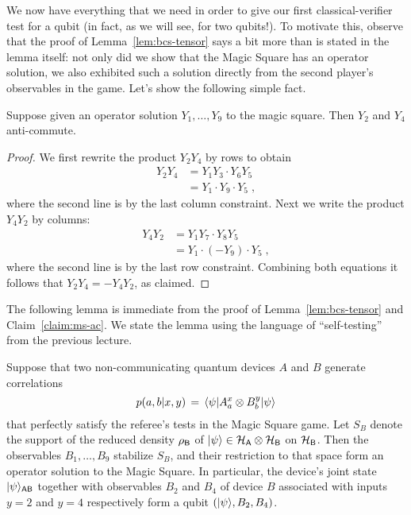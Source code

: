We now have everything that we need in order to give our first classical-verifier test for a qubit (in fact, as we will see, for two qubits!). To motivate this, observe that the proof of Lemma~\ref{lem:bcs-tensor} says a bit more than is stated in the lemma itself: not only did we show that the Magic Square has an operator solution, we also exhibited such a solution directly from the second player's observables in the game. Let's show the following simple fact. 

\begin{claim}\label{claim:ms-ac}
Suppose given an operator solution $Y_1,\ldots,Y_9$ to the magic square. Then $Y_2$ and $Y_4$ anti-commute. 
\end{claim}

\begin{proof}
We first rewrite the product $Y_2Y_4$ by rows to obtain 
\begin{align*}
Y_2 Y_4 &= Y_1 Y_3\cdot   Y_6 Y_5 \\
&= Y_1 \cdot Y_9 \cdot Y_5\;,
\end{align*}
where the second line is by the last column constraint. Next we write the product $Y_4 Y_2$ by columns: 
\begin{align*}
Y_4 Y_2 &=  Y_1 Y_7 \cdot Y_8 Y_5  \\
&= Y_1 \cdot (-Y_9) \cdot Y_5 \;,
\end{align*}
where the second line is by the last row constraint. Combining both equations it follows that $Y_2 Y_4 = -Y_4 Y_2$, as claimed. 
\end{proof}

The following lemma is immediate from the proof of Lemma~\ref{lem:bcs-tensor} and Claim~\ref{claim:ms-ac}. We state the lemma using the language of ``self-testing'' from the previous lecture. 

\begin{lemma}\label{lem:ms-perfect}
Suppose that two non-communicating quantum devices $A$ and $B$ generate correlations 
\[ p(a,b|x,y)\,=\, \langle\psi| A^x_a \otimes B^y_b|\psi\rangle\]
 that perfectly satisfy the referee's tests in the Magic Square game. Let $S_B$ denote the support of the reduced density $\rho_{\textsf{B}}$ of $|\psi\rangle\in\mathcal{H}_{\textsf{A}}\otimes \mathcal{H}_{\textsf{B}}$ on $\mathcal{H}_{\textsf{B}}$.  Then the observables $B_1,\ldots,B_9$ stabilize $S_B$, and their restriction to that space form an operator solution to the Magic Square.
In particular, the device's joint state $|\psi\rangle_{\textsf{AB}}$ together with observables $B_2$ and $B_4$ of device $B$ associated with inputs $y=2$ and $y=4$ respectively form a qubit $(|\psi\rangle,B_2,B_4)$. 
\end{lemma}

